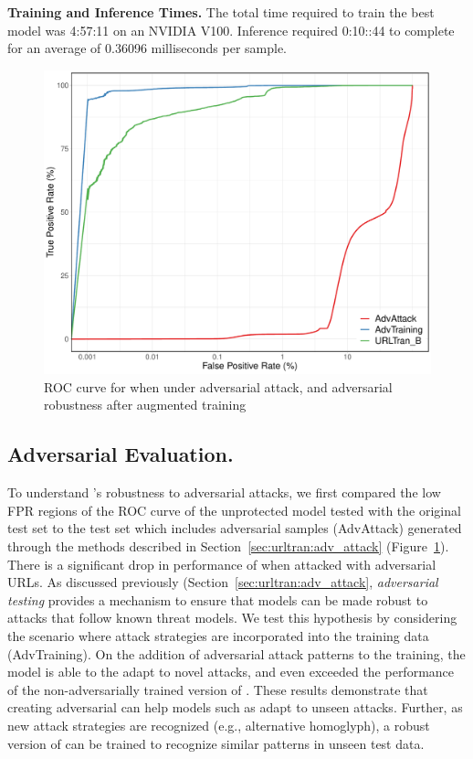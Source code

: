 %

\noindent\textbf{Training and Inference Times.}
The total time required to train the best \URLTranSysb model was 4:57:11 on an NVIDIA V100. Inference
required 0:10::44 to complete for an average of 0.36096 milliseconds per sample.


\begin{figure}
    \centering
	\includegraphics[width=0.7\linewidth]{urltran/figures/log_roc_adv_R}
	\caption{ROC curve for \URLTranSysb when under adversarial attack, and adversarial robustness after augmented training}
	\label{fig:urltran:adversarial_roc}
\end{figure} 

\subsection{Adversarial Evaluation.}
To understand \URLTranSys's robustness to adversarial attacks, we first compared the low FPR regions of the ROC curve of the unprotected model tested with the original test set to the
test set which includes adversarial samples (AdvAttack) generated through the methods described in Section~\ref{sec:urltran:adv_attack} (Figure~\ref{fig:urltran:adversarial_roc}).
There is a significant drop in performance of \URLTranSysb when attacked with adversarial URLs.
As discussed previously (Section~\ref{sec:urltran:adv_attack}, \textit{adversarial testing} provides a mechanism to ensure that models can be made robust to attacks that follow known threat models.
We test this hypothesis by considering the scenario where attack strategies are incorporated into the training data (AdvTraining).
On the addition of adversarial attack patterns to the training, the model is able to  the adapt to novel attacks, and even exceeded the performance of the non-adversarially trained version of \URLTranSys.
These results demonstrate that  creating adversarial can help models such as \URLTranSys adapt to unseen attacks.
Further, as new attack strategies are recognized (e.g., alternative homoglyph), a robust version of \URLTranSys can be trained to recognize similar patterns in unseen test data.

